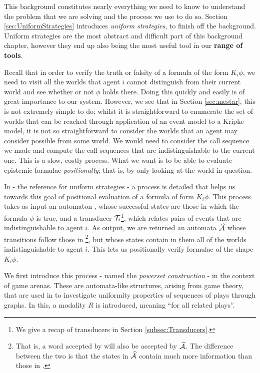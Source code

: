 \documentclass[10pt, a4paper]{report}
\begin{document}
This background constitutes nearly everything we need to know to understand the
problem that we are solving and the process we use to do so. Section
\ref{sec:UniformStrategies} introduces \emph{uniform strategies}, to finish off
the background. Uniform strategies are the most abstract and difficult part of
this background chapter, however they end up also being the most useful tool in
our \textbf{range of tools}.

Recall that in order to verify the truth or falsity of a formula of the form
$K_i \phi$, we need to visit all the worlds that agent $i$ cannot distinguish
from their current world and see whether or not $\phi$ holds there. Doing this
quickly and easily is of great importance to our system. However, we see that in
Section \ref{sec:mestar}, this is not extremely simple to do; whilst it is
straightforward to enumerate the set of worlds that can be reached through
application of an event model to a Kripke model, it is not so straightforward to
consider the worlds that an agent may consider possible from some world. We
would need to consider the call sequence we made and compute the call sequences
that are indistinguishable to the current one. This is a slow, costly process.
What we want is to be able to evaluate epistemic formulae \emph{positionally};
that is, by only looking at the world in question.

In \cite{UniformStrategies} - the reference for uniform strategies - a process
is detailed that helps us towards this goal of positional evaluation of a
formula of form $K_i \phi$. This process takes as input an automaton ,
whose successful states are those in which the formula $\phi$ is true, and a
transducer $\mathcal{T}_i$\footnote{We give a recap of transducers in Section
  \ref{subsec:Transducers}.}, which relates pairs of events that are
indistinguishable to agent $i$. As output, we are returned an automata
$\widehat{\mathcal{A}}$ whose transitions follow those in \footnote{That is,
  a word accepted by  will also be accepted by $\widehat{\mathcal{A}}$. The
  difference between the two is that the states in $\widehat{\mathcal{A}}$ contain
  much more information than those in .}, but whose states
contain in them all of the worlds indistinguishable to agent $i$. This lets us
positionally verify formulae of the shape $K_i \phi$.

\bigskip

We first introduce this process - named the \emph{powerset construction} - in
the context of game arenas. These are automata-like structures, arising from
game theory, that are used in \cite{UniformStrategies} to investigate uniformity
properties of sequences of plays through graphs. In this, a modality $R$ is
introduced, meaning ``for all related plays''.
\end{document}
